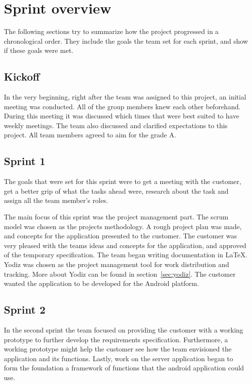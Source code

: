 \section{Sprint overview}
The following sections try to summarize how the project progressed in a chronological order. They include the goals the team set for each sprint, and show if these goals were met.

\subsection{Kickoff}
In the very beginning, right after the team was assigned to this project, an initial meeting was conducted. All of the group members knew each other beforehand. During this meeting it was discussed which times that were best suited to have weekly meetings. The team also discussed and clarified expectations to this project. All team members agreed to aim for the grade A.

\subsection{Sprint 1}
The goals that were set for this sprint were to get a meeting with the customer, get a better grip of what the tasks ahead were, research about the task and assign all the team member's roles.

The main focus of this sprint was the project management part. The scrum model was chosen as the projects methodology. A rough project plan was made, and concepts for the application presented to the customer. The customer was very pleased with the teams ideas and concepts for the application, and approved of the temporary specification. The team began writing documentation in \LaTeX. Yodiz was chosen as the project management tool for work distribution and tracking. More about Yodiz can be found in section~\ref{sec:yodiz}. The customer wanted the application to be developed for the Android platform.

\subsection{Sprint 2}
In the second sprint the team focused on providing the customer with a working
prototype to further develop the requirements specification. Furthermore, a
working prototype might help the customer see how the team envisioned the application
and its functions. Lastly, work on the server application began to form the
foundation a framework of functions that the android application could use.

